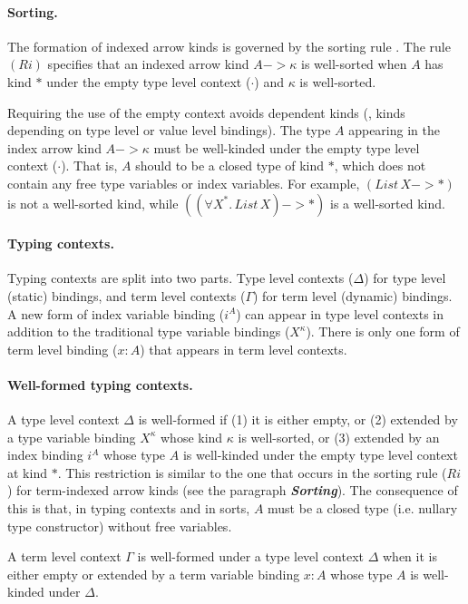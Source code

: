 \paragraph{Sorting.} \label{sorting}
The formation of indexed arrow kinds is
governed by the sorting rule . The rule $(Ri)$ specifies that
an indexed arrow kind $A -> \kappa$ is well-sorted when $A$ has kind $*$
under the empty type level context ($\cdot$) and $\kappa$ is well-sorted.

Requiring the use of the empty context avoids dependent kinds (\ie, kinds depending on type level or value level
bindings). The type $A$ appearing in
the index arrow kind $A -> \kappa$ must be well-kinded under
the empty type level context ($\cdot$).
That is, $A$ should to be a closed type of kind $*$,
which does not contain any free type variables or index variables.
For example, $(\textit{List}\,X -> *)$ is not a well-sorted kind,
while $((\forall X^{*}\!.\,\textit{List}\,X) -> *)$ is a well-sorted kind.

\paragraph{Typing contexts.}
Typing contexts are split into two parts.
Type level contexts ($\Delta$) for type level (static) bindings,
and term level contexts ($\Gamma$) for term level (dynamic) bindings.
A new form of index variable binding ($i^A$) can appear in
type level contexts in addition to the traditional type variable bindings ($X^\kappa$).
There is only one form of term level binding ($x:A$) that appears in
term level contexts.

\paragraph{Well-formed typing contexts.}
A type level context $\Delta$ is well-formed if (1) it is either empty,
or (2) extended by a type variable binding $X^\kappa$ whose kind $\kappa$ is
well-sorted, or (3) extended by an index binding $i^A$ whose type $A$ is
well-kinded under the empty type level context at kind $*$.
This restriction is similar to the one that occurs in the sorting rule ($Ri$)
for term-indexed arrow kinds (see the paragraph {\bf\textit{Sorting}}).
The consequence of this is that, in typing contexts and in sorts, $A$ must be
a closed type (i.e. nullary type constructor) without free variables.

A term level context $\Gamma$ is well-formed under a type level context
$\Delta$ when it is either empty or extended by a term variable binding
$x:A$ whose type $A$ is well-kinded under $\Delta$.


